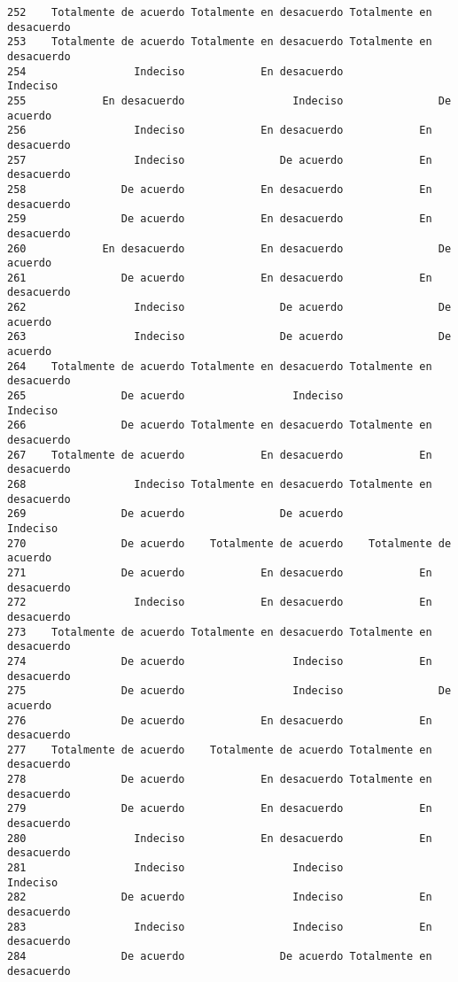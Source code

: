 \documentclass[
  letterpaper,
  DIV=11,
  numbers=noendperiod]{scrartcl}
\begin{document}
\begin{verbatim}
252    Totalmente de acuerdo Totalmente en desacuerdo Totalmente en desacuerdo
253    Totalmente de acuerdo Totalmente en desacuerdo Totalmente en desacuerdo
254                 Indeciso            En desacuerdo                 Indeciso
255            En desacuerdo                 Indeciso               De acuerdo
256                 Indeciso            En desacuerdo            En desacuerdo
257                 Indeciso               De acuerdo            En desacuerdo
258               De acuerdo            En desacuerdo            En desacuerdo
259               De acuerdo            En desacuerdo            En desacuerdo
260            En desacuerdo            En desacuerdo               De acuerdo
261               De acuerdo            En desacuerdo            En desacuerdo
262                 Indeciso               De acuerdo               De acuerdo
263                 Indeciso               De acuerdo               De acuerdo
264    Totalmente de acuerdo Totalmente en desacuerdo Totalmente en desacuerdo
265               De acuerdo                 Indeciso                 Indeciso
266               De acuerdo Totalmente en desacuerdo Totalmente en desacuerdo
267    Totalmente de acuerdo            En desacuerdo            En desacuerdo
268                 Indeciso Totalmente en desacuerdo Totalmente en desacuerdo
269               De acuerdo               De acuerdo                 Indeciso
270               De acuerdo    Totalmente de acuerdo    Totalmente de acuerdo
271               De acuerdo            En desacuerdo            En desacuerdo
272                 Indeciso            En desacuerdo            En desacuerdo
273    Totalmente de acuerdo Totalmente en desacuerdo Totalmente en desacuerdo
274               De acuerdo                 Indeciso            En desacuerdo
275               De acuerdo                 Indeciso               De acuerdo
276               De acuerdo            En desacuerdo            En desacuerdo
277    Totalmente de acuerdo    Totalmente de acuerdo Totalmente en desacuerdo
278               De acuerdo            En desacuerdo Totalmente en desacuerdo
279               De acuerdo            En desacuerdo            En desacuerdo
280                 Indeciso            En desacuerdo            En desacuerdo
281                 Indeciso                 Indeciso                 Indeciso
282               De acuerdo                 Indeciso            En desacuerdo
283                 Indeciso                 Indeciso            En desacuerdo
284               De acuerdo               De acuerdo Totalmente en desacuerdo

\end{verbatim}
\end{document}
